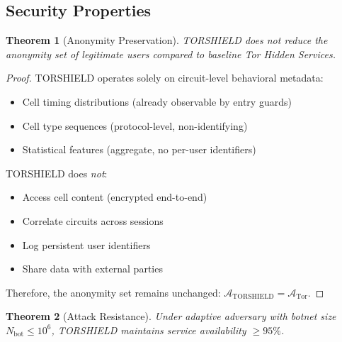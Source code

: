 \documentclass[11pt,a4paper]{article}
\newtheorem{theorem}{Theorem}[section]
\begin{document}
\subsection{Security Properties}

\begin{theorem}[Anonymity Preservation]
TORSHIELD does not reduce the anonymity set of legitimate users compared to baseline Tor Hidden Services.
\end{theorem}

\begin{proof}
TORSHIELD operates solely on circuit-level behavioral metadata:
\begin{itemize}
\item Cell timing distributions (already observable by entry guards)
\item Cell type sequences (protocol-level, non-identifying)
\item Statistical features (aggregate, no per-user identifiers)
\end{itemize}

TORSHIELD does \textit{not}:
\begin{itemize}
\item Access cell content (encrypted end-to-end)
\item Correlate circuits across sessions
\item Log persistent user identifiers
\item Share data with external parties
\end{itemize}

Therefore, the anonymity set remains unchanged: $\mathcal{A}_{\text{TORSHIELD}} = \mathcal{A}_{\text{Tor}}$.
\end{proof}

\begin{theorem}[Attack Resistance]
Under adaptive adversary with botnet size $N_{\text{bot}} \leq 10^6$, TORSHIELD maintains service availability $\geq 95\%$.
\end{theorem}
\end{document}

